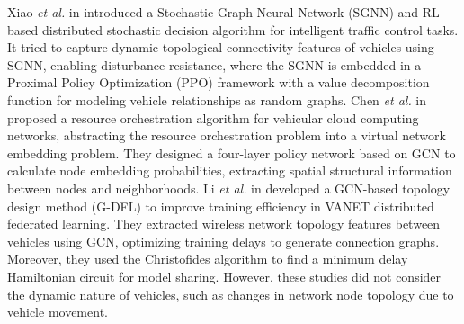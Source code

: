 \documentclass[lettersize,journal,onecolumn]{IEEEtran}
\begin{document}
Xiao \emph{et al.} in \cite{ref21} introduced a Stochastic Graph Neural Network (SGNN) and RL-based distributed stochastic decision algorithm for intelligent traffic control tasks. It tried to capture dynamic topological connectivity features of vehicles using SGNN, enabling disturbance resistance, where the SGNN is embedded in a Proximal Policy Optimization (PPO) framework with a value decomposition function for modeling vehicle relationships as random graphs.
Chen \emph{et al.} in \cite{ref22} proposed a resource orchestration algorithm for vehicular cloud computing networks, abstracting the resource orchestration problem into a virtual network embedding problem. They designed a four-layer policy network based on GCN to calculate node embedding probabilities, extracting spatial structural information between nodes and neighborhoods.
Li \emph{et al.} in \cite{ref23} developed a GCN-based topology design method (G-DFL) to improve training efficiency in VANET distributed federated learning. They extracted wireless network topology features between vehicles using GCN, optimizing training delays to generate connection graphs. Moreover, they used the Christofides algorithm to find a minimum delay Hamiltonian circuit for model sharing.
However, these studies did not consider the dynamic nature of vehicles, such as changes in network node topology due to vehicle movement.
\end{document}
